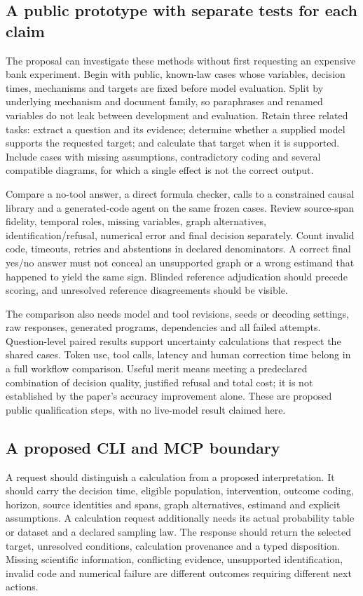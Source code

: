 \subsection{A public prototype with separate tests for each claim}
\label{exec21:prophets-validation}
The proposal can investigate these methods without first requesting an expensive
bank experiment. Begin with public, known-law cases whose variables, decision
times, mechanisms and targets are fixed before model evaluation. Split by
underlying mechanism and document family, so paraphrases and renamed variables
do not leak between development and evaluation. Retain three related tasks:
extract a question and its evidence; determine whether a supplied model supports
the requested target; and calculate that target when it is supported. Include
cases with missing assumptions, contradictory coding and several compatible
diagrams, for which a single effect is not the correct output.

Compare a no-tool answer, a direct formula checker, calls to a constrained
causal library and a generated-code agent on the same frozen cases. Review
source-span fidelity, temporal roles, missing variables, graph alternatives,
identification/refusal, numerical error and final decision separately. Count
invalid code, timeouts, retries and abstentions in declared denominators. A
correct final yes/no answer must not conceal an unsupported graph or a wrong
estimand that happened to yield the same sign. Blinded reference adjudication
should precede scoring, and unresolved reference disagreements should be visible.

The comparison also needs model and tool revisions, seeds or decoding settings,
raw responses, generated programs, dependencies and all failed attempts.
Question-level paired results support uncertainty calculations that respect the
shared cases. Token use, tool calls, latency and human correction time belong
in a full workflow comparison. Useful merit means meeting a predeclared
combination of decision quality, justified refusal and total cost; it is not
established by the paper's accuracy improvement alone. These are proposed
public qualification steps, with no live-model result claimed here.

\subsection{A proposed CLI and MCP boundary}
\label{exec21:prophets-contract}
A request should distinguish a calculation from a proposed interpretation. It
should carry the decision time, eligible population, intervention, outcome
coding, horizon, source identities and spans, graph alternatives, estimand and
explicit assumptions. A calculation request additionally needs its actual
probability table or dataset and a declared sampling law. The response should
return the selected target, unresolved conditions, calculation provenance and a
typed disposition. Missing scientific information, conflicting evidence,
unsupported identification, invalid code and numerical failure are different
outcomes requiring different next actions.

